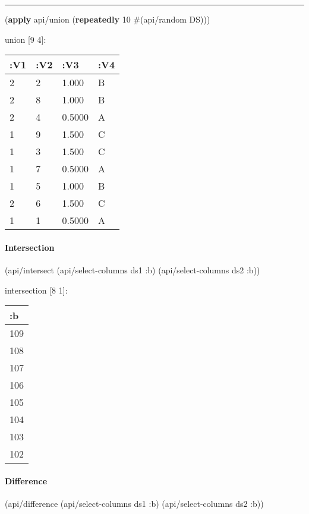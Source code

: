 \documentclass[]{article}
\newenvironment{Shaded}{\begin{snugshade}}{\end{snugshade}}
\newcommand{\KeywordTok}[1]{\textcolor[rgb]{0.13,0.29,0.53}{\textbf{#1}}}
\newcommand{\DecValTok}[1]{\textcolor[rgb]{0.00,0.00,0.81}{#1}}
\newcommand{\AttributeTok}[1]{\textcolor[rgb]{0.77,0.63,0.00}{#1}}
\newcommand{\NormalTok}[1]{#1}
\let\oldparagraph\paragraph
\renewcommand{\paragraph}[1]{\oldparagraph{#1}\mbox{}}
\begin{document}
\begin{center}\rule{0.5\linewidth}{0.5pt}\end{center}

\begin{Shaded}
\begin{Highlighting}[]
\NormalTok{(}\KeywordTok{apply}\NormalTok{ api/union (}\KeywordTok{repeatedly} \DecValTok{10}\NormalTok{ #(api/random DS)))}
\end{Highlighting}
\end{Shaded}

union {[}9 4{]}:

\begin{longtable}[]{@{}llll@{}}
\toprule
:V1 & :V2 & :V3 & :V4\tabularnewline
\midrule
\endhead
2 & 2 & 1.000 & B\tabularnewline
2 & 8 & 1.000 & B\tabularnewline
2 & 4 & 0.5000 & A\tabularnewline
1 & 9 & 1.500 & C\tabularnewline
1 & 3 & 1.500 & C\tabularnewline
1 & 7 & 0.5000 & A\tabularnewline
1 & 5 & 1.000 & B\tabularnewline
2 & 6 & 1.500 & C\tabularnewline
1 & 1 & 0.5000 & A\tabularnewline
\bottomrule
\end{longtable}

\paragraph{Intersection}\label{intersection}

\begin{Shaded}
\begin{Highlighting}[]
\NormalTok{(api/intersect (api/select-columns ds1 }\AttributeTok{:b}\NormalTok{)}
\NormalTok{               (api/select-columns ds2 }\AttributeTok{:b}\NormalTok{))}
\end{Highlighting}
\end{Shaded}

intersection {[}8 1{]}:

\begin{longtable}[]{@{}l@{}}
\toprule
:b\tabularnewline
\midrule
\endhead
109\tabularnewline
108\tabularnewline
107\tabularnewline
106\tabularnewline
105\tabularnewline
104\tabularnewline
103\tabularnewline
102\tabularnewline
\bottomrule
\end{longtable}

\paragraph{Difference}\label{difference}

\begin{Shaded}
\begin{Highlighting}[]
\NormalTok{(api/difference (api/select-columns ds1 }\AttributeTok{:b}\NormalTok{)}
\NormalTok{                (api/select-columns ds2 }\AttributeTok{:b}\NormalTok{))}
\end{Highlighting}
\end{Shaded}
\end{document}
